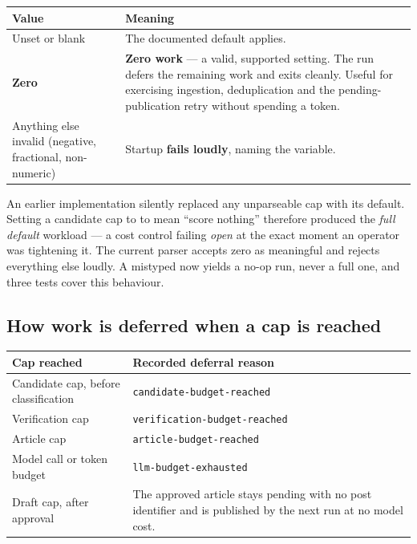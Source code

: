 \documentclass[11pt,a4paper]{article}
\newcommand{\brk}{\hyphenpenalty=0\exhyphenpenalty=0\relax}
\newcommand{\code}[1]{\texttt{\small\brk #1}}
\begin{document}
\begin{center}
\small
\begin{tabularx}{\textwidth}{@{}p{4.4cm} >{\RaggedRight}X@{}}
\toprule
\textbf{Value} & \textbf{Meaning} \\
\midrule
Unset or blank & The documented default applies. \\
\textbf{Zero} & \textbf{Zero work} --- a valid, supported setting. The run defers
  the remaining work and exits cleanly. Useful for exercising ingestion,
  deduplication and the pending-publication retry without spending a token. \\
Anything else invalid (negative, fractional, non-numeric) & Startup
  \textbf{fails loudly}, naming the variable. \\
\bottomrule
\end{tabularx}
\end{center}

\begin{blockbox}
An earlier implementation silently replaced any unparseable cap with its default.
Setting a candidate cap to \code{0} to mean ``score nothing'' therefore produced
the \emph{full default} workload --- a cost control failing \emph{open} at the exact
moment an operator was tightening it. The current parser accepts zero as
meaningful and rejects everything else loudly. A mistyped \code{0} now yields a
no-op run, never a full one, and three tests cover this behaviour.
\end{blockbox}

\subsection{How work is deferred when a cap is reached}

\begin{center}
\small
\begin{tabularx}{\textwidth}{@{}p{5.2cm} >{\RaggedRight}X@{}}
\toprule
\textbf{Cap reached} & \textbf{Recorded deferral reason} \\
\midrule
Candidate cap, before classification & \code{candidate-}\allowbreak\code{budget-reached} \\
Verification cap & \code{verification-}\allowbreak\code{budget-reached} \\
Article cap & \code{article-budget-reached} \\
Model call or token budget & \code{llm-budget-exhausted} \\
Draft cap, after approval & The approved article stays pending with no post
  identifier and is published by the next run at no model cost. \\
\bottomrule
\end{tabularx}
\end{center}
\end{document}
